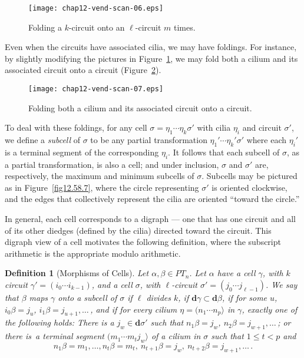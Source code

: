 \documentclass{surv-l}
\numberwithin{equation}{section}
\numberwithin{table}{section}
\numberwithin{figure}{section}
\theoremstyle{plain}
\newtheorem{definition}[equation]{Definition}
\theoremstyle{definition}
\begin{document}
\setcounter{figure}{3}
\begin{figure}[!h]
\texttt{[image: chap12-vend-scan-06.eps]}
\caption{Folding a $k$-circuit onto an $\ell$-circuit $m$
times.}\label{fig12.58.4}
\end{figure}

Even when the circuits have associated cilia, we may have
foldings. For instance, by slightly modifying the pictures in
Figure~\ref{fig12.58.4}, we may fold both a cilium and its
associated circuit onto a circuit (Figure~\ref{fig12.58.5}).

\begin{figure}[!h]
\texttt{[image: chap12-vend-scan-07.eps]}
\caption{Folding both a cilium and its associated circuit onto a circuit.}\label{fig12.58.5}
\end{figure}


To deal with these foldings, for any cell
$\sigma=\eta_{1}\cdots\eta_{k}\sigma'$ with cilia $\eta_{i}$ and
circuit $\sigma'$, we define a \emph{subcell} of
$\sigma$ to be any partial transformation
$\eta_{1}'\cdots\eta_{k}'\sigma'$ where each $\eta_{i}'$ is a
terminal segment of the corresponding $\eta_{i}$. It follows that
each subcell of $\sigma$, as a partial transformation, is also a
cell; and under inclusion, $\sigma$ and $\sigma'$ are,
respectively, the maximum and minimum subcells of $\sigma$.
Subcells may be pictured as in Figure~\ref{fig12.58.7}, where the
circle representing $\sigma'$ is oriented clockwise, and the edges
that collectively represent the cilia are oriented ``toward the
circle.''

In general, each cell corresponds to a
digraph --- one that has one circuit and all of its other
diedges (defined by the cilia) directed toward the circuit. This
digraph view of a cell motivates the following definition, where
the subscript arithmetic is the appropriate modulo arithmetic.

\setcounter{equation}{5}
\begin{definition}[Morphisms of Cells]\label{defn12.58.6}
Let $\alpha,\beta\in PT_{n}$. Let $\alpha$ have a cell $\gamma$,
with $k$ circuit $\gamma'=(i_{0}\cdots i_{k-1})$, and a cell
$\sigma$, with $\ell$-circuit $\sigma'=(j_{0} \cdots j_{\ell-1})$.
We say that $\beta$ maps $\gamma$ onto a subcell of $\sigma$ if
$\ell$ divides $k$, if $\mathbf{d}\gamma\subset \mathbf{d}\beta$,
if for some $u$, $i_{0}\beta=j_{u}$, $i_{1}\beta=j_{u+1}, \ldots\,$, and
if for every cilium $\eta=(n_{1}\cdots n_{p}\rangle$ in $\gamma$,
exactly one of the following holds: There is a $j_{w}\in
\mathbf{d}\sigma'$ such that $n_{1}\beta=j_{w}$,
$n_{2}\beta=j_{w+1},\ldots\,$; or there is~a terminal segment
$(m_{1}\cdots m_{t}j_{w}\rangle$ of a cilium in $\sigma$ such that
$1\leq t<p$ and
\[
n_{1}\beta=m_{1},\ldots, n_{t}\beta=m_{t},\ n_{t+1}\beta=j_{w},\ n_{t+2}\beta=j_{w+1},\ldots\,.
\]
\end{definition}
\end{document}
